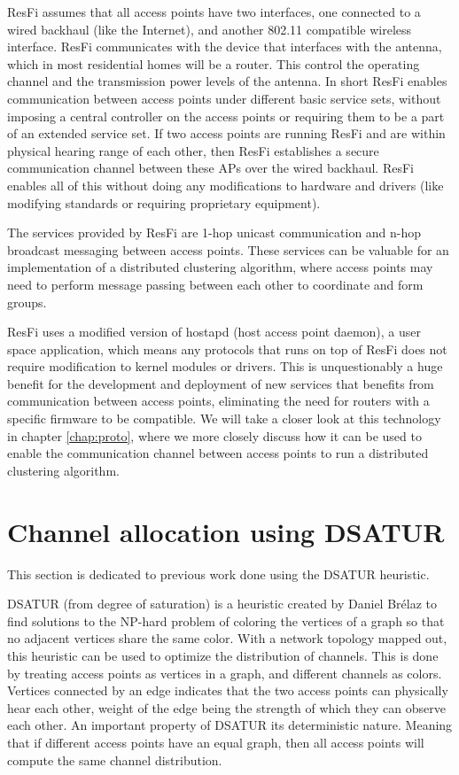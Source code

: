 ResFi assumes that all access points have two interfaces, one connected to a wired backhaul (like the Internet), and another
802.11 compatible wireless interface. ResFi communicates with the device that interfaces with the antenna, which in most residential homes will be a router. This control the operating channel and the transmission power levels of the antenna. In short ResFi enables communication between access points under different basic service sets, without imposing a central controller on the access points or
requiring them to be a part of an extended service set. If two access points are running ResFi and are within physical hearing range of each other, then ResFi 
establishes a secure communication channel between these APs over the wired backhaul. ResFi enables all of this without doing any modifications to hardware and drivers (like modifying standards or requiring proprietary equipment). 

The services provided by ResFi are 1-hop unicast communication and n-hop broadcast messaging between access points. These services can be valuable for an
implementation of a distributed clustering algorithm, where access points
may need to perform message passing between each other to coordinate and form groups. 

ResFi uses a modified version of hostapd (host access point daemon), a user space application, which means any
protocols that runs on top of ResFi does not require modification to kernel modules or drivers. This is unquestionably a huge benefit for the development and deployment of
new services that benefits from communication between access points, eliminating the need for routers with a specific firmware to be compatible. 
We will take a closer look at this technology in chapter \ref{chap:proto}, where we more closely discuss how it can be used to enable the
communication channel between access points to run a distributed clustering algorithm. 


\section{Channel allocation using DSATUR} 
This section is dedicated to previous work done using the DSATUR heuristic.

DSATUR (from degree of saturation) is a heuristic created by Daniel Brélaz \cite{Brelaz} to find solutions to the NP-hard problem of coloring the vertices of a graph so that no adjacent vertices share the same color.  With a network topology mapped out, this heuristic can be used to optimize the distribution of channels. This is done by treating access points as vertices in a graph, and different channels as colors. Vertices connected by an edge indicates that the two access points can physically hear each other, weight of the edge being the strength of which they can observe each other.  An
important property of DSATUR its deterministic nature. Meaning that if different access points have an equal graph, then all access points will compute the same channel distribution.

